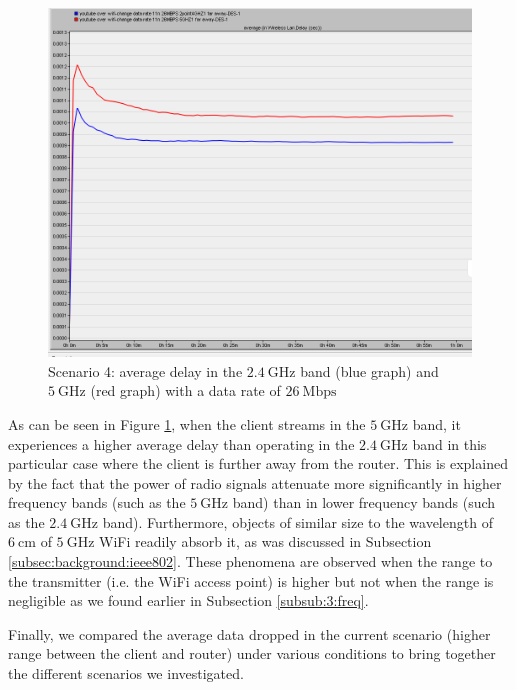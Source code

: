 \begin{figure}[H]
	\centering
	\includegraphics[scale=0.3]{Figures/amantianrenamed/Scenario4Avedelayof802.11n26Mbps2.4GHzand26Mbps5GHz.png}
	\caption[Scenario 4: average delay at $26~\mathrm{Mbps}$ in two frequency bands]{Scenario 4: average delay in the $2.4~\mathrm{GHz}$ band (blue graph) and $5~\mathrm{GHz}$ (red graph) with a data rate of $26~\mathrm{Mbps}$}
	\label{fig:4:6}
\end{figure}

As can be seen in Figure \ref{fig:4:6}, when the client streams in the $5~\mathrm{GHz}$ band, it experiences a higher average delay than operating in the $2.4~\mathrm{GHz}$ band in this particular case where the client is further away from the router. This is explained by the fact that the power of radio signals attenuate more significantly in higher frequency bands (such as the $5~\mathrm{GHz}$ band) than in lower frequency bands (such as the $2.4~\mathrm{GHz}$ band). 
Furthermore, objects of similar size to the wavelength of $6~\mathrm{cm}$ of $5~\mathrm{GHz}$ \gls{WiFi} readily absorb 
it, as was discussed in Subsection \ref{subsec:background:ieee802}. These phenomena are observed when the range to the transmitter (i.e. the \gls{WiFi} access point) is higher but not when the range is negligible as we found earlier in Subsection \ref{subsub:3:freq}.

Finally, we compared the average data dropped in the current scenario (higher range between the client and router) under various conditions to bring together the different scenarios we investigated.

